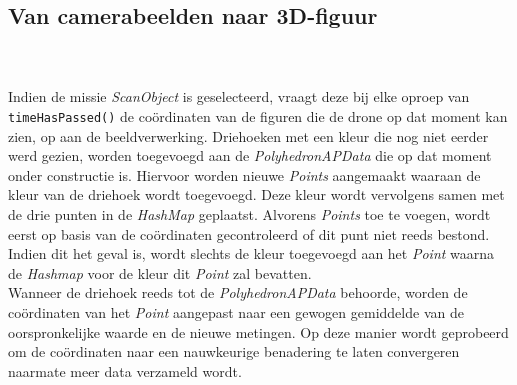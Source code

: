 \subsection{Van camerabeelden naar 3D-figuur}
\\
\noindent
\\
Indien de missie \textit{ScanObject} is geselecteerd, vraagt deze bij elke oproep van \texttt{timeHasPassed()} de co\"{o}rdinaten van de figuren die de drone op dat moment kan zien, op aan de beeldverwerking. Driehoeken met een kleur die nog niet eerder werd gezien, worden toegevoegd aan de \textit{PolyhedronAPData} die op dat moment onder constructie is. Hiervoor worden nieuwe \textit{Points} aangemaakt waaraan de kleur van de driehoek wordt toegevoegd. Deze kleur wordt vervolgens samen met de drie punten in de \textit{HashMap} geplaatst. Alvorens \textit{Points} toe te voegen, wordt eerst op basis van de co\"{o}rdinaten gecontroleerd of dit punt niet reeds bestond. Indien dit het geval is, wordt slechts de kleur toegevoegd aan het \textit{Point} waarna de \textit{Hashmap} voor de kleur dit \textit{Point} zal bevatten.\\
Wanneer de driehoek reeds tot de \textit{PolyhedronAPData} behoorde, worden de co\"{o}rdinaten van het \textit{Point} aangepast naar een gewogen gemiddelde van de oorspronkelijke waarde en de nieuwe metingen. Op deze manier wordt geprobeerd om de co\"{o}rdinaten naar een nauwkeurige benadering te laten convergeren naarmate meer data verzameld wordt.